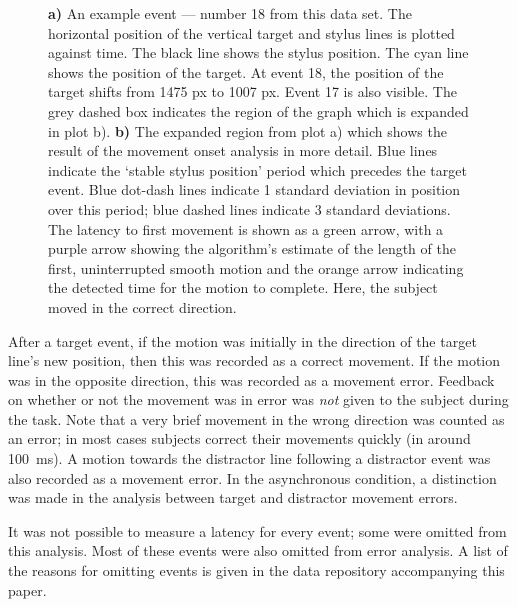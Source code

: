 \documentclass[10pt,letterpaper]{article}
\begin{document}
\begin{figure}[htb!]
\centering
\caption[Obtaining the latency, method 1] {\textbf{a)} An example
  event --- number 18 from this data set. The horizontal position of
  the vertical target and stylus lines is plotted against time. The
  black line shows the stylus position. The cyan line shows the
  position of the target. At event 18, the position of the target
  shifts from 1475 px to 1007 px. Event 17 is also visible. The grey
  dashed box indicates the region of the graph which is expanded in
  plot b). \textbf{b)} The expanded region from plot a) which shows
  the result of the movement onset analysis in more detail. Blue lines
  indicate the `stable stylus position' period which precedes the
  target event. Blue dot-dash lines indicate 1 standard deviation in
  position over this period; blue dashed lines indicate 3 standard
  deviations. The latency to first movement is shown as a green arrow,
  with a purple arrow showing the algorithm's estimate of the length
  of the first, uninterrupted smooth motion and the orange arrow
  indicating the detected time for the motion to complete. Here, the
  subject moved in the correct direction.}
\label{example_event}
\end{figure}

After a target event, if the motion was initially in the direction of
the target line's new position, then this was recorded as a correct
movement. If the motion was in the opposite direction, this was
recorded as a movement error. Feedback on whether or not the movement
was in error was \emph{not} given to the subject during the task. Note
that a very brief movement in the wrong direction was counted as an
error; in most cases subjects correct their movements quickly (in
around 100~ms). A motion towards the distractor line following a
distractor event was also recorded as a movement error. In the
asynchronous condition, a distinction was made in the analysis between
target and distractor movement errors.

It was not possible to measure a latency for every event; some were
omitted from this analysis. Most of these events were also omitted
from error analysis.
A list of the reasons for omitting events is given in the data
repository accompanying this paper.
\end{document}
